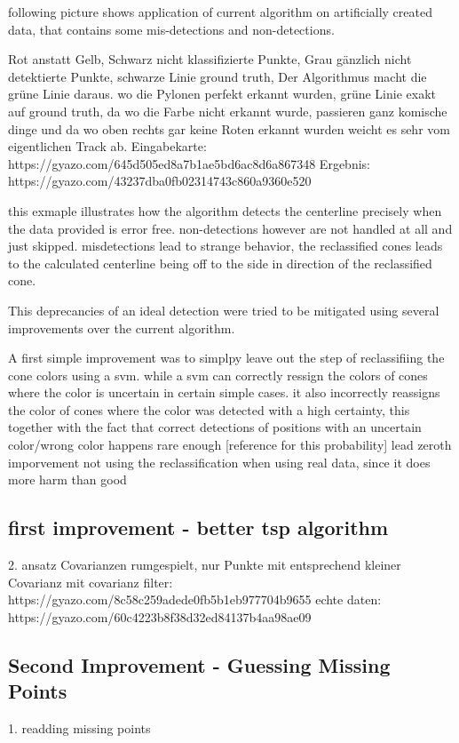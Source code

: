 following picture shows application of current algorithm on artificially created data, that contains some mis-detections and non-detections.

Rot anstatt Gelb, Schwarz nicht klassifizierte Punkte, Grau gänzlich nicht detektierte Punkte,
schwarze Linie ground truth,
Der Algorithmus macht die grüne Linie daraus.
wo die Pylonen perfekt erkannt wurden, grüne Linie exakt auf ground truth,
da wo die Farbe nicht erkannt wurde, passieren ganz komische dinge
und da wo oben rechts gar keine Roten erkannt wurden weicht es sehr vom eigentlichen Track ab.
Eingabekarte: https://gyazo.com/645d505ed8a7b1ae5bd6ac8d6a867348
Ergebnis: https://gyazo.com/43237dba0fb02314743c860a9360e520

this exmaple illustrates how the algorithm detects the centerline precisely when the data provided is error free. non-detections however are not handled at all and just skipped. misdetections lead to strange behavior, the reclassified cones leads to the calculated centerline being off to the side in direction of the reclassified cone.

This deprecancies of an ideal detection were tried to be mitigated using several improvements over the current algorithm.

A first simple improvement was to simplpy leave out the step of reclassifiing the cone colors using a svm. while a svm can correctly ressign the colors of cones where the color is uncertain in certain simple cases. it also incorrectly reassigns the color of cones where the color was detected with a high certainty, this together with the fact that correct detections of positions with an uncertain color/wrong color happens rare enough [reference for this probability] lead
zeroth imporvement not using the reclassification when using real data, since it does more harm than good

\subsection{first improvement - better tsp algorithm}

2. ansatz Covarianzen rumgespielt, nur Punkte mit entsprechend kleiner Covarianz
mit covarianz filter: https://gyazo.com/8c58c259adede0fb5b1eb977704b9655
echte daten:
https://gyazo.com/60c4223b8f38d32ed84137b4aa98ae09

\subsection{Second Improvement - Guessing Missing Points}
1. readding missing points

